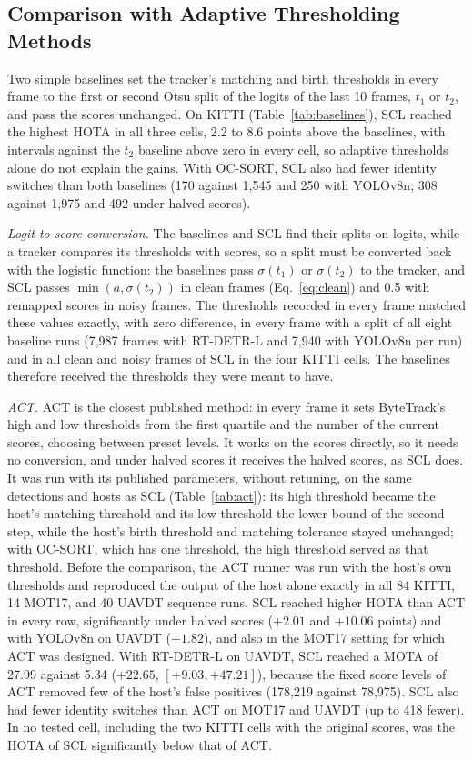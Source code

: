 \documentclass[pdflatex,sn-mathphys-num,iicol]{sn-jnl}
\newcommand{\scl}{SCL}
\begin{document}
\subsection{Comparison with Adaptive Thresholding Methods}\label{sec:baselines}
Two simple baselines set the tracker's matching and birth thresholds in every frame to the first or
second Otsu split of the logits of the last 10 frames, $t_1$ or $t_2$, and pass the scores
unchanged. On KITTI (Table~\ref{tab:baselines}), \scl{} reached the highest HOTA in all three
cells, 2.2 to 8.6 points above the baselines, with intervals against the $t_2$ baseline above zero
in every cell, so adaptive thresholds alone do not explain the gains. With OC-SORT, \scl{} also had
fewer identity switches than both baselines (170 against 1,545 and 250 with YOLOv8n; 308 against
1,975 and 492 under halved scores).

\emph{Logit-to-score conversion.} The baselines and \scl{} find their splits on logits, while a
tracker compares its thresholds with scores, so a split must be converted back with the logistic
function: the baselines pass $\sigma(t_1)$ or $\sigma(t_2)$ to the tracker, and \scl{} passes
$\min(a,\sigma(t_2))$ in clean frames (Eq.~\eqref{eq:clean}) and 0.5 with remapped scores in noisy
frames. The thresholds recorded in every frame matched these values exactly, with zero difference,
in every frame with a split of all eight baseline runs (7,987 frames with RT-DETR-L and 7,940
with YOLOv8n per run) and in all clean and noisy frames of \scl{} in the four KITTI cells. The baselines therefore received the thresholds they were meant to have.

\emph{ACT.} ACT \cite{act2026adaptive} is the closest published method: in every frame it sets
ByteTrack's high and low thresholds from the first quartile and the number of the current scores,
choosing between preset levels. It works on the scores directly, so it needs no conversion, and
under halved scores it receives the halved scores, as \scl{} does. It was run with its published
parameters, without retuning, on the same detections and hosts as \scl{} (Table~\ref{tab:act}):
its high threshold became the host's matching threshold and its low threshold the lower bound of
the second step, while the host's birth threshold and matching tolerance stayed unchanged; with
OC-SORT, which has one threshold, the high threshold served as that threshold. Before the
comparison, the ACT runner was run with the host's own thresholds and reproduced the output of the
host alone exactly in all 84 KITTI, 14 MOT17, and 40 UAVDT sequence runs. \scl{} reached higher HOTA
than ACT in every row, significantly under halved
scores ($+2.01$ and $+10.06$ points) and with YOLOv8n on UAVDT ($+1.82$), and also in the MOT17
setting for which ACT was designed. With RT-DETR-L on UAVDT, \scl{} reached a MOTA of 27.99 against
5.34 ($+22.65$, $[+9.03,+47.21]$), because the fixed score levels of ACT removed few of the host's
false positives (178,219 against 78,975). \scl{} also had fewer identity switches than ACT on
MOT17 and UAVDT (up to 418 fewer). In no tested cell, including the two KITTI cells with the
original scores, was the HOTA of \scl{} significantly below that of ACT.
\end{document}
